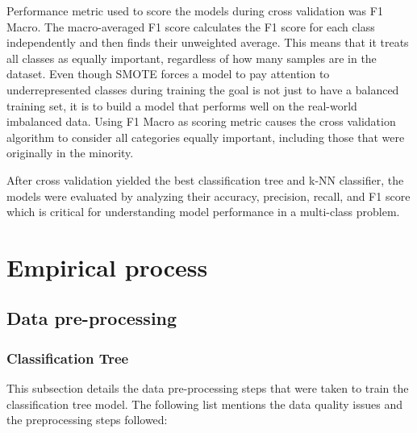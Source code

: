 \documentclass[conference]{IEEEtran}
\begin{document}
Performance metric used to score the models during cross validation was F1 Macro. The macro-averaged F1 score calculates the F1 score for each class independently and then finds their unweighted average. This means that it treats all classes as equally important, regardless of how many samples are in the dataset. Even though SMOTE forces a model to pay attention to underrepresented classes during training the goal is not just to have a balanced training set, it is to build a model that performs well on the real-world imbalanced data. Using F1 Macro as scoring metric causes the cross validation algorithm to consider all categories equally important, including those that were originally in the minority.

After cross validation yielded the best classification tree and k-NN classifier, the models were evaluated by analyzing their accuracy, precision, recall, and F1 score which is critical for understanding model performance in a multi-class problem.

\section{\textbf{Empirical process}}

\subsection{\textbf{Data pre-processing}}

\subsubsection{\textbf{Classification Tree}}

This subsection details the data pre-processing steps that were taken to train the classification tree model. The following list mentions the data quality issues and the preprocessing steps followed:
\end{document}
